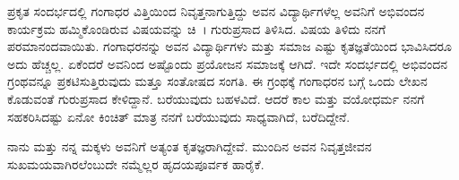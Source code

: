 {ಪ್ರಕೃತ ಸಂದರ್ಭದಲ್ಲಿ ಗಂಗಾಧರ ವಿತ್ತಿಯಿಂದ ನಿವೃತ್ತನಾಗುತ್ತಿದ್ದು ಅವನ ವಿದ್ಯಾರ್ಥಿಗಳೆಲ್ಲ ಅವನಿಗೆ ಅಭಿವಂದನ ಕಾರ್ಯಕ್ರಮ ಹಮ್ಮಿಕೊಂಡಿರುವ ವಿಷಯವನ್ನು ಚಿ~। ಗುರುಪ್ರಸಾದ ತಿಳಿಸಿದ. ವಿಷಯ ತಿಳಿದು ನನಗೆ ಪರಮಾನಂದವಾಯಿತು. ಗಂಗಾಧರನನ್ನು ಅವನ ವಿದ್ಯಾರ್ಥಿಗಳು ಮತ್ತು ಸಮಾಜ ಎಷ್ಟು ಕೃತಜ್ಞತೆಯಿಂದ ಭಾವಿಸಿದರೂ ಅದು ಹೆಚ್ಚಲ್ಲ. ಏಕೆಂದರೆ ಅವನಿಂದ ಅಷ್ಟೊಂದು ಪ್ರಯೋಜನ ಸಮಾಜಕ್ಕೆ ಆಗಿದೆ. ಇದೇ ಸಂದರ್ಭದಲ್ಲಿ ಅಭಿವಂದನ ಗ್ರಂಥವನ್ನೂ ಪ್ರಕಟಿಸುತ್ತಿರುವುದು ಮತ್ತೂ ಸಂತೋಷದ ಸಂಗತಿ. ಈ ಗ್ರಂಥಕ್ಕೆ ಗಂಗಾಧರನ ಬಗ್ಗೆ ಒಂದು ಲೇಖನ ಕೊಡುವಂತೆ ಗುರುಪ್ರಸಾದ ಕೇಳಿದ್ದಾನೆ. ಬರೆಯುವುದು ಬಹಳವಿದೆ. ಆದರೆ ಕಾಲ ಮತ್ತು ವಯೋಧರ್ಮ ನನಗೆ ಸಹಕರಿಸಿದಷ್ಟು   \enginline{-}   ಏನೋ ಕಿಂಚಿತ್ ಮಾತ್ರ ನನಗೆ ಬರೆಯುವುದು ಸಾಧ್ಯವಾಗಿದೆ, ಬರೆದಿದ್ದೇನೆ.  

ನಾನು ಮತ್ತು ನನ್ನ ಮಕ್ಕಳು ಅವನಿಗೆ ಅತ್ಯಂತ ಕೃತಜ್ಞರಾಗಿದ್ದೇವೆ. ಮುಂದಿನ ಅವನ ನಿವೃತ್ತಜೀವನ ಸುಖಮಯವಾಗಿರಲೆಂಬುದೇ ನಮ್ಮೆಲ್ಲರ ಹೃದಯಪೂರ್ವಕ ಹಾರೈಕೆ.

\articleend	
}
